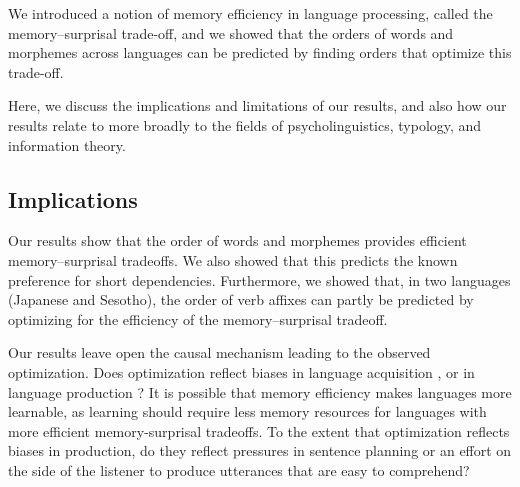 We introduced a notion of memory efficiency in language processing, called the memory--surprisal trade-off, and we showed that the orders of words and morphemes across languages can be predicted by finding orders that optimize this trade-off. 

Here, we discuss the implications and limitations of our results, and also how our results relate to more broadly to the fields of psycholinguistics, typology, and information theory.



\subsection{Implications}
Our results show that the order of words and morphemes provides efficient memory--surprisal tradeoffs.
We also showed that this predicts the known preference for short dependencies.
Furthermore, we showed that, in two languages (Japanese and Sesotho), the order of verb affixes can partly be predicted by optimizing for the efficiency of the memory--surprisal tradeoff.





Our results leave open the causal mechanism leading to the observed optimization.
Does optimization reflect biases in language acquisition \citep[e.g.]{fedzechkina2012language, culbertson2012learning}, or in language production \citep[e.g.]{macdonald2013language}?
It is possible that memory efficiency makes languages more learnable, as learning should require less memory resources for languages with more efficient memory-surprisal tradeoffs.
To the extent that optimization reflects biases in production, do they reflect pressures in sentence planning \citep{macdonald2013language} or an effort on the side of the listener to produce utterances that are easy to comprehend?


